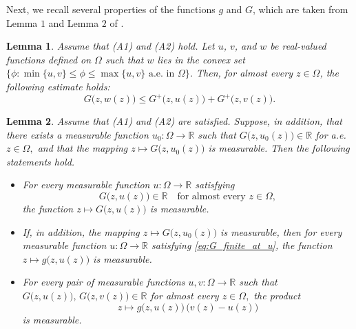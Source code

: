\documentclass[11pt]{article}
\newtheorem{lemma}{Lemma}[section] %
\newcommand{\om} {\Omega}
\begin{document}
Next, we recall several properties of the functions $g$ and $G$, which are taken from Lemma $1$ and Lemma $2$ of \cite{hirano_concave_convex}.


\begin{lemma}\label{lem:property_G_1}
Assume that \textnormal{(A1)} and \textnormal{(A2)} hold. 
Let $u$, $v$, and $w$ be real-valued functions defined on $\Omega$ such that $w$ lies in the convex set $\{ \phi : \min \{u, v \} \leq \phi \leq \max \{u, v \} \text{ a.e. in } \om \}$. Then, for almost every $z \in \Omega$, the following estimate holds:
\begin{equation*}
G\bigl(z, w(z)\bigr) \le G^{+}\bigl(z, u(z)\bigr) + G^{+}\bigl(z, v(z)\bigr).
\end{equation*}
\end{lemma}

\begin{lemma}
\label{lem:measurability_properties_G_g}
Assume that \textnormal{(A1)} and \textnormal{(A2)} are satisfied. 
Suppose, in addition, that there exists a measurable function $u_0 : \Omega \to \mathbb{R}$ such that $G\bigl(z, u_0(z)\bigr) \in \mathbb{R}$ for a.e. $z \in \Omega,$
and that the mapping $z \mapsto G\bigl(z, u_0(z)\bigr)$ is measurable. 
Then the following statements hold.
\begin{itemize}
    \item For every measurable function $u : \Omega \to \mathbb{R}$ satisfying
\begin{equation}
\label{eq:G_finite_at_u}
G\bigl(z, u(z)\bigr) \in \mathbb{R}
\quad \text{for almost every } z \in \Omega,
\end{equation}
the function $z \mapsto G\bigl(z, u(z)\bigr)$ is measurable.
    \item If, in addition, the mapping $z \mapsto G\bigl(z, u_0(z)\bigr)$ is measurable, then for every measurable function $u : \Omega \to \mathbb{R}$ satisfying \eqref{eq:G_finite_at_u}, the function $z \mapsto g\bigl(z, u(z)\bigr)$ is measurable. 
    \item For every pair of measurable functions $u, v : \Omega \to \mathbb{R}$ such that $G\bigl(z, u(z)\bigr), \, G\bigl(z, v(z)\bigr) \in \mathbb{R}$ for almost every $z \in \Omega,$ the product
\begin{equation*}
z \mapsto g\bigl(z, u(z)\bigr)\,\bigl(v(z) - u(z)\bigr)
\end{equation*}
is measurable.
\end{itemize}
\end{lemma}
\end{document}

